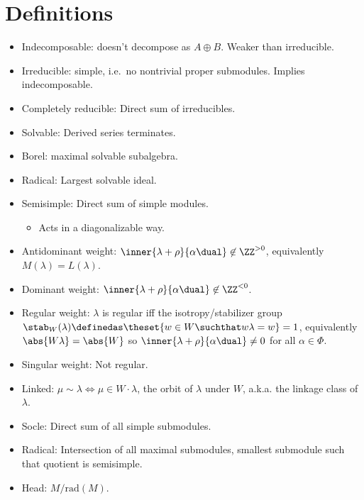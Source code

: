 \newpage
\tableofcontents

\hypertarget{definitions}{%
\section{Definitions}\label{definitions}}

\begin{itemize}
\tightlist
\item
  Indecomposable: doesn't decompose as \(A \oplus B\). Weaker than
  irreducible.
\item
  Irreducible: simple, i.e.~no nontrivial proper submodules. Implies
  indecomposable.
\item
  Completely reducible: Direct sum of irreducibles.
\item
  Solvable: Derived series terminates.
\item
  Borel: maximal solvable subalgebra.
\item
  Radical: Largest solvable ideal.
\item
  Semisimple: Direct sum of simple modules.

  \begin{itemize}
  \tightlist
  \item
    Acts in a diagonalizable way.
  \end{itemize}
\item
  Antidominant weight:
  \(\inner{\lambda + \rho}{\alpha\dual} \not\in\ZZ^{>0}\), equivalently
  \(M(\lambda) = L(\lambda)\).
\item
  Dominant weight:
  \(\inner{\lambda + \rho}{\alpha\dual} \not\in \ZZ^{< 0}\).
\item
  Regular weight: \(\lambda\) is regular iff the isotropy/stabilizer
  group
  \(\stab_W(\lambda) \definedas \theset{w\in W\suchthat w\lambda = w}= 1\),
  equivalently \(\abs{W\lambda} = \abs{W}\) so
  \(\inner{\lambda + \rho}{\alpha\dual} \neq 0\) for all
  \(\alpha\in \Phi\).
\item
  Singular weight: Not regular.
\item
  Linked: \(\mu \sim \lambda \iff \mu \in W\cdot \lambda\), the orbit of
  \(\lambda\) under \(W\), a.k.a. the linkage class of \(\lambda\).
\item
  Socle: Direct sum of all simple submodules.
\item
  Radical: Intersection of all maximal submodules, smallest submodule
  such that quotient is semisimple.
\item
  Head: \(M / \mathrm{rad}(M)\).
\end{itemize}

